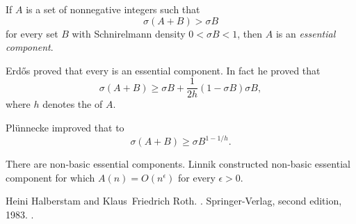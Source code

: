 \documentclass[12pt]{article}
\begin{document}
If $A$ is a set of nonnegative integers such that 
\begin{equation}
\sigma(A+B)>\sigma B
\end{equation}
for every set $B$ with Schnirelmann density $0<\sigma B<1$, then $A$ is an \emph{essential component}.

Erd\H{o}s proved that every  is an essential component. In fact he proved that
\begin{equation*}
\sigma(A+B)\geq \sigma B+\frac{1}{2h}(1-\sigma B)\sigma B,
\end{equation*}
where $h$ denotes the  of $A$.

Pl\"unnecke improved that to
\begin{equation*}
\sigma(A+B)\geq \sigma B^{1-1/h}.
\end{equation*}

There are non-basic essential components. Linnik constructed non-basic essential component for which $A(n)=O(n^\epsilon)$ for every $\epsilon>0$.

\begin{thebibliography}{1}

Heini Halberstam and Klaus~Friedrich Roth.
.
\newblock Springer-Verlag, second edition, 1983.
\newblock {}.

\end{thebibliography}

\end{document}
